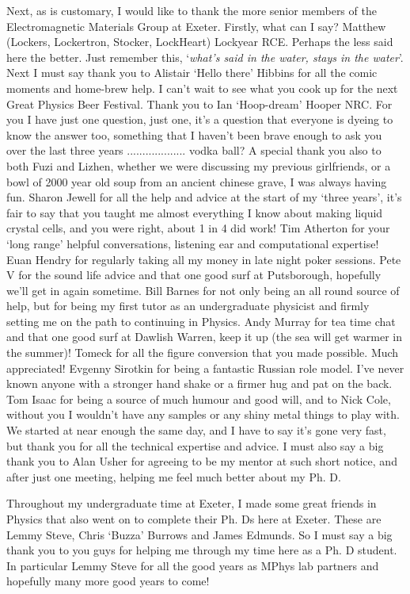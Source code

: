 Next, as is customary, I would like to thank the more senior members of the Electromagnetic Materials Group at Exeter. Firstly, what can I say? Matthew (Lockers, Lockertron, Stocker, LockHeart) Lockyear RCE. Perhaps the less said here the better. Just remember this, `\textit{what's said in the water, stays in the water}'. Next I must say thank you to Alistair `Hello there' Hibbins for all the comic moments and home-brew help. I can't wait to see what you cook up for the next Great Physics Beer Festival. Thank you to Ian `Hoop-dream' Hooper NRC. For you I have just one question, just one, it's a question that everyone is dyeing to know the answer too, something that I haven't been brave enough to ask you over the last three years ................... vodka ball? A special thank you also to both Fuzi and Lizhen, whether we were discussing my previous girlfriends, or a bowl of 2000 year old soup from an ancient chinese grave, I was always having fun. Sharon Jewell for all the help and advice at the start of my `three years', it's fair to say that you taught me almost everything I know about making liquid crystal cells, and you were right, about 1 in 4 did work! Tim Atherton for your `long range' helpful conversations, listening ear and computational expertise! Euan Hendry for regularly taking all my money in late night poker sessions. Pete V for the sound life advice and that one good surf at Putsborough, hopefully we'll get in again sometime. Bill Barnes for not only being an all round source of help, but for being my first tutor as an undergraduate physicist and firmly setting me on the path to continuing in Physics. Andy Murray for tea time chat and that one good surf at Dawlish Warren, keep it up (the sea will get warmer in the summer)! Tomeck for all the figure conversion that you made possible. Much appreciated! Evgenny Sirotkin for being a fantastic Russian role model. I've never known anyone with a stronger hand shake or a firmer hug and pat on the back. Tom Isaac for being a source of much humour and good will, and to Nick Cole, without you I wouldn't have any samples or any shiny metal things to play with. We started at near enough the same day, and I have to say it's gone very fast, but thank you for all the technical expertise and advice. I must also say a big thank you to Alan Usher for agreeing to be my mentor at such short notice, and after just one meeting, helping me feel much better about my Ph. D.

Throughout my undergraduate time at Exeter, I made some great friends in Physics that also went on to complete their Ph. Ds here at Exeter. These are Lemmy Steve, Chris `Buzza' Burrows and James Edmunds. So I must say a big thank you to you guys for helping me through my time here as a Ph. D student. In particular Lemmy Steve for all the good years as MPhys lab partners and hopefully many more good years to come!


